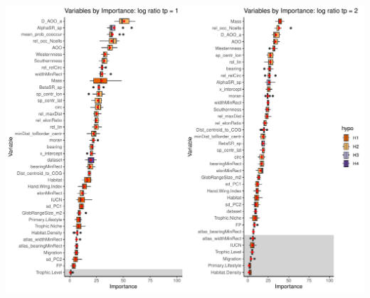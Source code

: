 \documentclass[
  letterpaper,
  DIV=11,
  numbers=noendperiod]{scrreprt}
\begin{document}
\includegraphics{02_rfe_files/figure-pdf/rfe-results-boxplot-lr-3.pdf}
\end{document}
